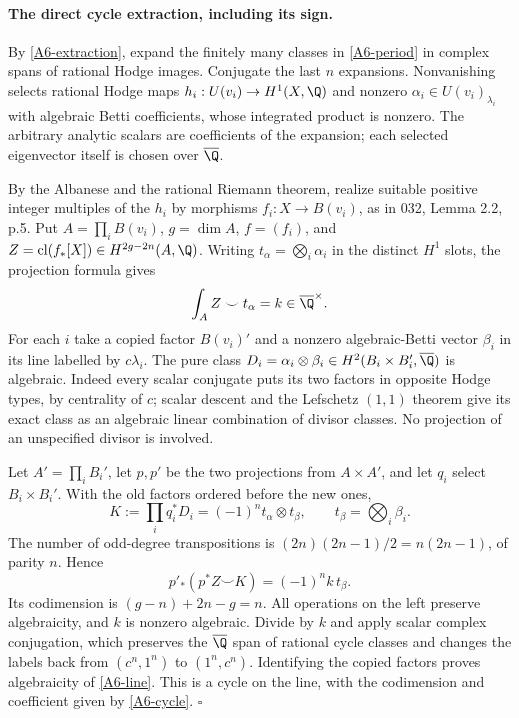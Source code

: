 \paragraph{The direct cycle extraction, including its sign.}
By \eqref{A6-extraction}, expand the finitely many classes in
\eqref{A6-period} in complex spans of rational Hodge images.
Conjugate the last $n$ expansions. Nonvanishing selects rational
Hodge maps
$h_i:U(v_i)\to H^1(X,\Q)$ and nonzero
$\alpha_i\in U(v_i)_{\lambda_i}$ with algebraic Betti
coefficients, whose integrated product is nonzero. The arbitrary
analytic scalars are coefficients of the expansion; each selected
eigenvector itself is chosen over $\overline\Q$.

By the Albanese and the rational Riemann theorem, realize suitable
positive integer multiples of the $h_i$ by morphisms
$f_i:X\to B(v_i)$, as in 032, Lemma 2.2, p.5. Put
$A=\prod_iB(v_i)$, $g=\dim A$, $f=(f_i)$, and
$Z=\operatorname{cl}(f_*[X])\in H^{2g-2n}(A,\Q)$.
Writing $t_\alpha=\bigotimes_i\alpha_i$ in the distinct
$H^1$ slots, the projection formula gives
\[
 \int_A Z\smile t_\alpha=k\in\overline\Q^\times.
\]
For each $i$ take a copied factor $B(v_i)'$ and a nonzero
algebraic-Betti vector $\beta_i$ in its line labelled by
$c\lambda_i$. The pure class
$D_i=\alpha_i\otimes\beta_i\in H^2(B_i\times B_i',\overline\Q)$
is algebraic. Indeed every scalar conjugate puts its two factors
in opposite Hodge types, by centrality of $c$; scalar descent and
the Lefschetz $(1,1)$ theorem give its exact class as an algebraic
linear combination of divisor classes. No projection of an
unspecified divisor is involved.

Let $A'=\prod_i B_i'$, let $p,p'$ be the two projections from
$A\times A'$, and let $q_i$ select $B_i\times B_i'$. With the old
factors ordered before the new ones,
\[
 K:=\prod_iq_i^*D_i=(-1)^n t_\alpha\otimes t_\beta,
 \qquad t_\beta=\bigotimes_i\beta_i.
\]
The number of odd-degree transpositions is
$(2n)(2n-1)/2=n(2n-1)$, of parity $n$. Hence
\begin{equation}\label{A6-cycle}
 p'_*(p^*Z\smile K)=(-1)^n k\,t_\beta.
\end{equation}
Its codimension is $(g-n)+2n-g=n$. All operations on the left
preserve algebraicity, and $k$ is nonzero algebraic. Divide by $k$
and apply scalar complex conjugation, which preserves the
$\overline\Q$ span of rational cycle classes and changes the labels
back from $(c^n,1^n)$ to $(1^n,c^n)$. Identifying the copied factors
proves algebraicity of \eqref{A6-line}. This is a cycle on the line,
with the codimension and coefficient given by \eqref{A6-cycle}.
\hfill$\square$

